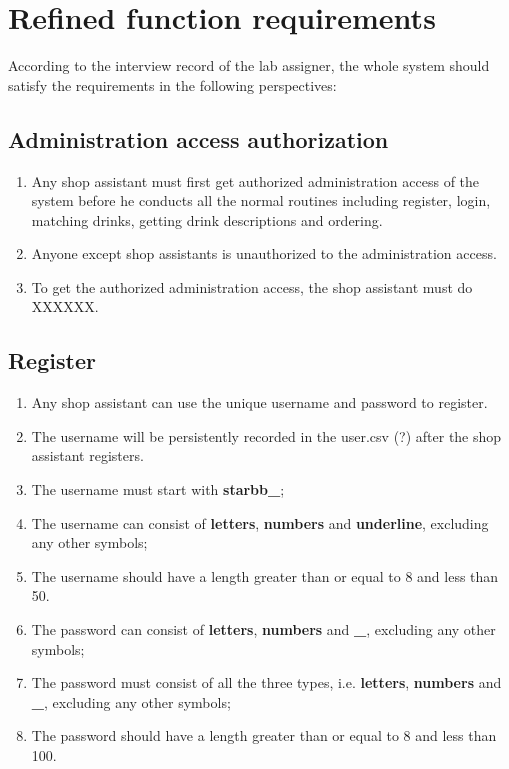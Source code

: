 \documentclass[a4paper]{report}
\begin{document}
\section{Refined function requirements}
According to the interview record of the lab assigner, the whole system should satisfy the requirements in the following perspectives:
\subsection{Administration access authorization}
\begin{enumerate}
\item Any shop assistant must first get authorized administration access of the system before he conducts all the normal routines including register, login, matching drinks, getting drink descriptions and ordering. 
\item Anyone except shop assistants is unauthorized to the administration access.
\item To get the authorized administration access, the shop assistant must do XXXXXX.
\end{enumerate}

\subsection{Register}
\begin{enumerate}
\item Any shop assistant can use the unique username and password to register.
\item The username will be persistently recorded in the user.csv (?) after the shop assistant registers.
\item The username must start with \textbf{starbb\_};
\item The username can consist of \textbf{letters}, \textbf{numbers} and \textbf{underline}, excluding any other symbols;
\item The username should have a length greater than or equal to 8 and less than 50.
\item The password can consist of \textbf{letters}, \textbf{numbers} and \textbf{\_}, excluding any other symbols;
\item The password must consist of all the three types, i.e. \textbf{letters}, \textbf{numbers} and \textbf{\_}, excluding any other symbols;
\item The password should have a length greater than or equal to 8 and less than 100.
\end{enumerate}
\end{document}
